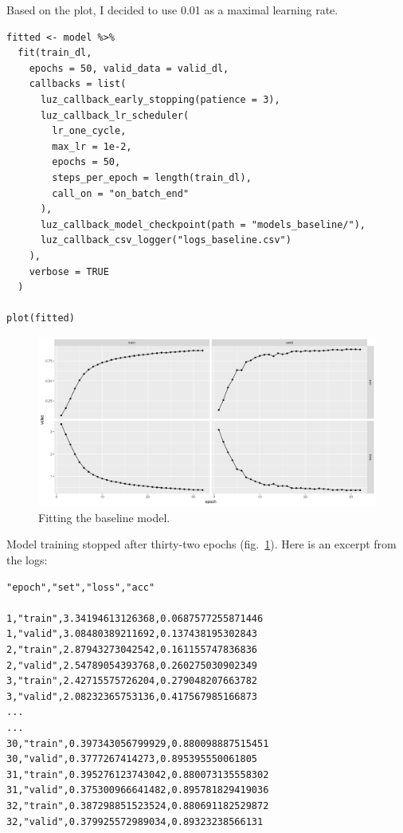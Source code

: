 \documentclass[
  letterpaper,
]{krantz}
\begin{document}
Based on the plot, I decided to use 0.01 as a maximal learning rate.

\begin{verbatim}
fitted <- model %>%
  fit(train_dl,
    epochs = 50, valid_data = valid_dl,
    callbacks = list(
      luz_callback_early_stopping(patience = 3),
      luz_callback_lr_scheduler(
        lr_one_cycle,
        max_lr = 1e-2,
        epochs = 50,
        steps_per_epoch = length(train_dl),
        call_on = "on_batch_end"
      ),
      luz_callback_model_checkpoint(path = "models_baseline/"),
      luz_callback_csv_logger("logs_baseline.csv")
    ),
    verbose = TRUE
  )

plot(fitted)
\end{verbatim}

\begin{figure}[H]

{\centering \includegraphics{images/audio-fit-baseline.png}

}

\caption{\label{fig-audio-fit-baseline}Fitting the baseline model.}

\end{figure}

Model training stopped after thirty-two epochs
(fig.~\ref{fig-audio-fit-baseline}). Here is an excerpt from the logs:

\begin{verbatim}
"epoch","set","loss","acc"

1,"train",3.34194613126368,0.0687577255871446
1,"valid",3.08480389211692,0.137438195302843
2,"train",2.87943273042542,0.161155747836836
2,"valid",2.54789054393768,0.260275030902349
3,"train",2.42715575726204,0.279048207663782
3,"valid",2.08232365753136,0.417567985166873
...
...
30,"train",0.397343056799929,0.880098887515451
30,"valid",0.3777267414273,0.895395550061805
31,"train",0.395276123743042,0.880073135558302
31,"valid",0.375300966641482,0.895781829419036
32,"train",0.387298851523524,0.880691182529872
32,"valid",0.379925572989034,0.89323238566131
\end{verbatim}
\end{document}
